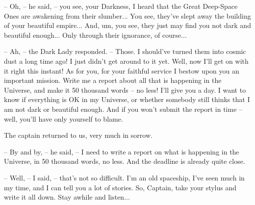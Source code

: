 \documentclass[ebook,oneside,final,openright]{memoir}
\begin{document}
– Oh, – he said, – you see, your Darkness, I heard that the Great Deep-Space Ones are awakening from their slumber... You see, they’ve slept away the building of your beautiful empire... And, um, you see, they just may find you not dark and beautiful enough... Only through their ignorance, of course...\par
– Ah, – the Dark Lady responded. – Those. I should’ve turned them into cosmic dust a long time ago! I just didn’t get around to it yet. Well, now I’ll get on with it right this instant! As for you, for your faithful service I bestow upon you an important mission. Write me a report about all that is happening in the Universe, and make it 50 thousand words – no less! I’ll give you a day. I want to know if everything is OK in my Universe, or whether somebody still thinks that I am not dark or beautiful enough. And if you won’t submit the report in time – well, you’ll have only yourself to blame.\par
\par
The captain returned to us, very much in sorrow.\par
– By and by, – he said, – I need to write a report on what is happening in the Universe, in 50 thousand words, no less. And the deadline is already quite close.\par
– Well, – I said, – that’s not so difficult. I’m an old spaceship, I’ve seen much in my time, and I can tell you a lot of stories. So, Captain, take your stylus and write it all down. Stay awhile and listen...
\end{document}
